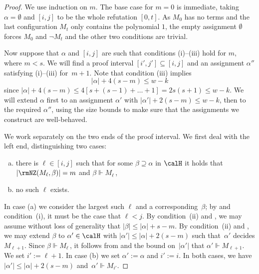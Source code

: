 \documentclass{toc}
\begin{document}
\begin{proof}
We use induction on $m$.
The base case for $m=0$ is immediate, taking $\alpha= \emptyset$
and $[i,j]$ to be the whole refutation $[0,t]$. 
As $M_0$ has no terms and the last configuration $M_t$ only contains the polynomial $1$, the empty assignment
$\emptyset$ forces $M_0$ and $\neg M_t$
and the other two conditions are trivial.

Now suppose that $\alpha$  and $[i,j]$ are such that conditions  (i)--(iii) 
hold for $m$, where $m < s$. 
We will find a proof interval $[i',j'] \subseteq [i,j]$ 
and an assignment $\alpha''$ satisfying (i)--(iii) for~$m+1$. 
Note that condition (iii) implies 
\begin{equation*}\label{eq:bound1}
|\alpha| + 4(s-m)  \le w-k
\end{equation*}
since
$|\alpha| + 4(s-m)  \le 
4[ s + (s-1) + \dots + 1] 
= 2s(s+1) \le w-k$.
We will extend $\alpha$ first to 
an assignment $\alpha'$ with $|\alpha'| + 2(s-m) \le w-k$, then to the required $\alpha''$,
using the size bounds to make sure that the assignments we construct are well-behaved.

We work separately on the two ends of the proof interval.
We first deal with the left end, distinguishing two cases:
\begin{enumerate}[(a)]
\item 
there is $\ell \in [i,j]$ such that for some $\beta \supseteq \alpha$ in $\calH$
it holds that $|\rmNZ(M_\ell, \beta)| = m$ and $\beta \Vdash M_\ell$\,,
\item 
no such $\ell$ exists.
\end{enumerate}
In case (a) we consider the largest such $\ell$ and a corresponding~$\beta$; 
by  and condition~(i), it must be the case that $\ell < j$. 
By condition~(ii) and , we may assume without
loss of generality that $|\beta| \le |\alpha| + s-m$.
By condition~(ii) and , we may extend $\beta$
to $\alpha' \in \calH$ with $|\alpha'| \le |\alpha| + 2(s-m)$ 
such that~$\alpha'$ decides $M_{\ell +1}$.
Since $\beta \Vdash M_{\ell}$\,, 
it follows from  and the bound on~$|\alpha'|$ that 
$\alpha' \Vdash M_{\ell+1}$. We set $i' := \ell +1$.
In case (b) we set $\alpha' :=\alpha$ and  $i' := i$.
In both cases,
we have $|\alpha'| \le |\alpha|+2(s-m)$ and~$\alpha' \Vdash M_{i'}$.


\end{proof}
\end{document}
